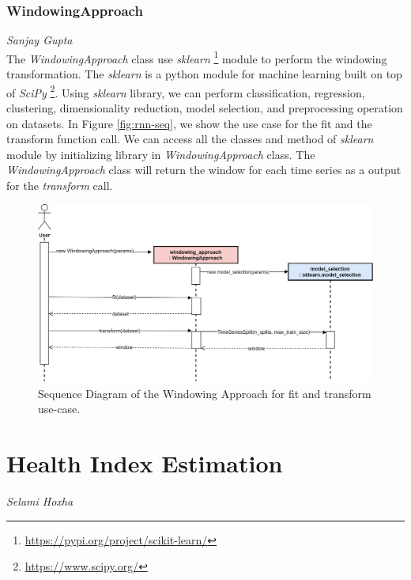 \subsubsection*{WindowingApproach}
\vspace*{-10mm}\hfill{\normalsize\emph{Sanjay Gupta}}
\\
The \textit{WindowingApproach} class use \textit{sklearn} \footnote{\href{https://pypi.org/project/scikit-learn/}{https://pypi.org/project/scikit-learn/}} module to perform the windowing transformation. The \textit{sklearn} is a python module for machine learning built on top of \textit{SciPy} \footnote{\href{https://www.scipy.org/}{https://www.scipy.org/}}. Using \textit{sklearn} library, we can perform classification, regression, clustering, dimensionality reduction, model selection, and preprocessing operation on datasets. In Figure \ref{fig:rnn-seq}, we show the use case for the fit and the transform function call. We can access all the classes and method of \textit{sklearn} module by initializing library in \textit{WindowingApproach} class. The \textit{WindowingApproach} class will return the window for each time series as a output for the \textit{transform} call.
\begin{figure}[ht]
    \centering
    \includegraphics[width=\textwidth]{gfx/WindowApproach-Sequence}
    \caption{Sequence Diagram of the Windowing Approach for fit and transform use-case.}
    \label{fig:window-seq}
\end{figure}

\newpage
\section{Health Index Estimation}
\vspace*{-15mm}\hfill{\normalsize\emph{Selami Hoxha}}
\label{sec:system_design:health_index}

